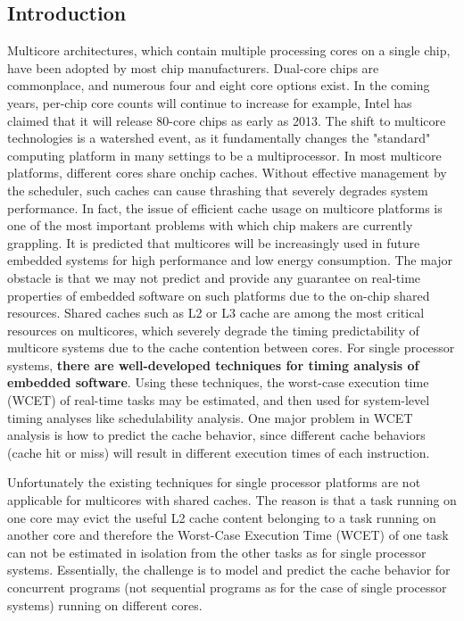 \documentclass[a4paper,10pt]{article}
\begin{document}
\vspace{4ex}	%
\begin{multicols}{2}

\section{Introduction}

Multicore architectures, which contain multiple processing cores on a single chip, have been adopted by most chip manufacturers.
Dual-core chips are commonplace, and numerous four and eight core options exist. In the coming years, per-chip core counts will continue to
increase for example, Intel has claimed that it will release 80-core chips as early as 2013. The shift to multicore technologies is a 
watershed event, as it fundamentally changes the "standard" computing platform in many settings to be a multiprocessor. In most multicore 
platforms, different cores share onchip caches. Without effective management by the scheduler, such caches can cause thrashing that 
severely degrades system performance. In fact, the issue of efficient cache
usage on multicore platforms is one of the most important problems with which chip makers are currently grappling.
It is predicted that multicores will be increasingly used in future embedded systems for high performance and low energy consumption. The
major obstacle is that we may not predict and provide any guarantee on real-time properties of embedded software on such platforms due to the on-chip
shared resources. Shared caches such as L2 or L3 cache are among the most critical resources on multicores, which severely degrade the timing
predictability of multicore systems due to the cache contention between cores. For single processor systems, 
\textbf{there are well-developed techniques for timing analysis of embedded software}. Using these techniques, the worst-case execution time 
(WCET) of real-time tasks may be estimated, and then used for system-level timing analyses like schedulability analysis. One major problem in 
WCET analysis is how to predict the cache behavior, since different cache behaviors (cache hit or miss) will result in different 
execution times of each instruction.

Unfortunately the existing techniques for single processor platforms are not applicable for multicores with shared caches. The reason is
that a task running on one core may evict the useful L2 cache content belonging to a task running on another core and therefore the
Worst-Case Execution Time (WCET) of one task can not be estimated in isolation from the other tasks as for single processor systems. 
Essentially, the challenge is to model and predict the cache behavior for concurrent programs (not sequential programs as for the case of 
single processor systems) running on different cores.



\end{multicols}
\end{document}
